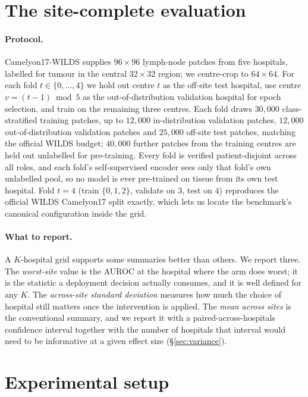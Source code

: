 \documentclass[10pt]{article} %
\begin{document}
\section{The site-complete evaluation}
\label{sec:protocol}

\paragraph{Protocol.} Camelyon17-WILDS supplies $96\times96$ lymph-node patches
from five hospitals, labelled for tumour in the central $32\times32$ region;
we centre-crop to $64\times64$. For each fold $t \in \{0,\dots,4\}$ we hold out
centre $t$ as the off-site test hospital, use centre $v=(t-1)\bmod 5$ as the
out-of-distribution validation hospital for epoch selection, and train on the
remaining three centres. Each fold draws $30{,}000$ class-stratified training
patches, up to $12{,}000$ in-distribution validation patches, $12{,}000$
out-of-distribution validation patches and $25{,}000$ off-site test patches,
matching the official WILDS budget; $40{,}000$ further patches from the
training centres are held out unlabelled for pre-training. Every fold is
verified patient-disjoint across all roles, and each fold's self-supervised
encoder sees only that fold's own unlabelled pool, so no model is ever
pre-trained on tissue from its own test hospital. Fold $t=4$ (train
$\{0,1,2\}$, validate on $3$, test on $4$) reproduces the official WILDS
Camelyon17 split exactly, which lets us locate the benchmark's canonical
configuration inside the grid.

\paragraph{What to report.} A $K$-hospital grid supports some summaries better
than others. We report three. The \emph{worst-site} value is the AUROC at the
hospital where the arm does worst; it is the statistic a deployment decision
actually consumes, and it is well defined for any $K$. The \emph{across-site
standard deviation} measures how much the choice of hospital still matters once
the intervention is applied. The \emph{mean across sites} is the conventional
summary, and we report it with a paired-across-hospitals confidence interval
together with the number of hospitals that interval would need to be
informative at a given effect size (\S\ref{sec:variance}).

\section{Experimental setup}
\label{sec:setup}
\end{document}
